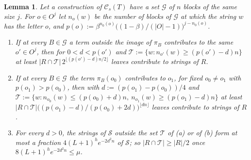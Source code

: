 \documentclass[11pt]{article}
\newtheorem{lemma}[theorem]{Lemma}
\theoremstyle{definition}
\theoremstyle{remark}
\begin{document}
\begin{lemma}\label{a:lem:count}
Let a construction of $\mathcal C_s(T)$ have a set $\mathcal G$ of $n$ blocks of the same size $j$. For $o\in O^j$ let $n_o(w)$ be the number of blocks of $\mathcal G$ at which the string $w$ has the letter $o$, and $p(o):=\beta^{n_0(o)}\big((1-\beta)/(|O|-1)\big)^{j-n_0(o)}$.
\begin{enumerate}[label=(\alph*),nosep]
\item If at every $B\in\mathcal G$ a term outside the image of $\pi_B$ contributes to the same $o'\in O^j$, then for $0<d<p(o')$ and $\mathcal T:=\{w:n_{o'}(w)\ge(p(o')-d)n\}$ at least $|R\cap \mathcal T|\,2^{\lfloor(p(o')-d)n/2\rfloor}$ leaves contribute to strings of $R$.
\item If at every $B\in\mathcal G$ the term $\pi_B(o_0)$ contributes to $o_1$, for fixed $o_0\ne o_1$ with $p(o_1)>p(o_0)$, then with $d:=(p(o_1)-p(o_0))/4$ and $\mathcal T:=\{w:n_{o_0}(w)\le(p(o_0)+d)n,\ n_{o_1}(w)\ge(p(o_1)-d)n\}$ at least $|R\cap \mathcal T|\big((p(o_1)-d)/(p(o_0)+2d)\big)^{\lfloor dn\rfloor}$ leaves contribute to strings of $R$.
\item For every $d>0$, the strings of $\mathcal S$ outside the set $\mathcal T$ of (a) or of (b) form at most a fraction $4(L+1)^he^{-2d^2n}$ of $\mathcal S$; so $|R\cap \mathcal T|\ge|R|/2$ once $8(L+1)^he^{-2d^2n}\le\mu$.
\end{enumerate}
\end{lemma}
\end{document}
